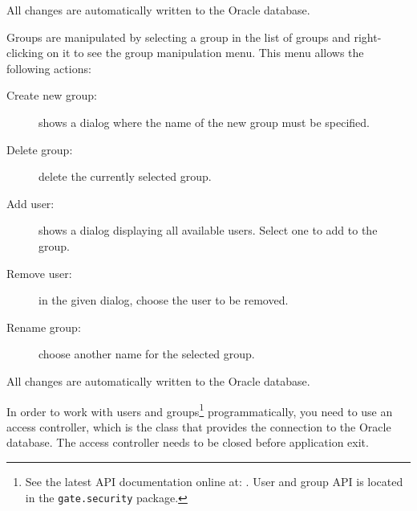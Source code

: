 All changes are automatically written to the Oracle database.


Groups are manipulated by selecting a group in the list of groups and
right-clicking on it to see the group manipulation menu. This menu
allows the following actions:
\begin{description}
        \item[Create new group:] shows a dialog where the name of the
        new group must be specified.
        \item[Delete group:] delete the currently selected group.
        \item[Add user:] shows a dialog displaying all available
        users. Select one to add to the group.
        \item[Remove user:] in the given dialog, choose the user
        to be removed.
        \item[Rename group:] choose another name for the selected group.
\end{description}

All changes are automatically written to the Oracle database.


In order to work with users and groups\footnote{See the
latest API documentation online at: . User and group API is
located in the {\tt gate.security} package.} programmatically, you need
to use an access controller, which is the class that provides the
connection to the Oracle database. The access controller needs to be
closed before application exit.

